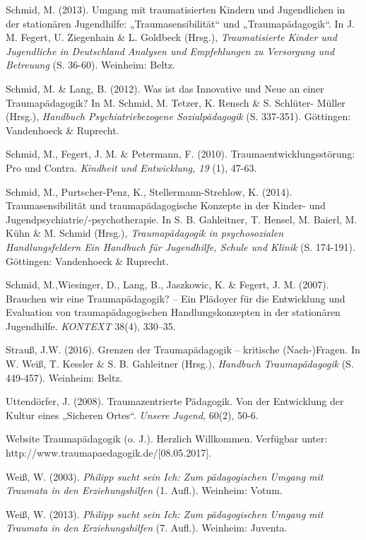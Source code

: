 \hang
Schmid, M. (2013). Umgang mit traumatisierten Kindern und Jugendlichen in der station{\"a}ren Jugendhilfe: „Traumasensibilit{\"a}t“ und „Traumap{\"a}dagogik“. In J. M. Fegert, U. Ziegenhain \& L. Goldbeck (Hrsg.), \textit{Traumatisierte Kinder und Jugendliche in Deutschland Analysen und Empfehlungen zu Versorgung und Betreuung} (S. 36-60). Weinheim: Beltz.

\hang
Schmid, M. \& Lang, B. (2012). Was ist das Innovative und Neue an einer Traumap{\"a}dagogik? In M. Schmid, M. Tetzer, K. Rensch \& S. Schlüter- Müller (Hrsg.), \textit{Handbuch Psychiatriebezogene Sozialpädagogik} (S. 337-351). Göttingen: Vandenhoeck \& Ruprecht.

\hang
Schmid, M., Fegert, J. M. \& Petermann, F. (2010). Traumaentwicklungsstörung: Pro und Contra. \textit{Kindheit und Entwicklung, 19} (1), 47-63.

\hang
Schmid, M., Purtscher-Penz, K., Stellermann-Strehlow, K. (2014). Traumasensibilit{\"a}t und traumap{\"a}dagogische Konzepte in der Kinder- und Jugendpsychiatrie/-psychotherapie. In S. B. Gahleitner, T. Hensel, M. Baierl, M. K{\"u}hn \& M. Schmid (Hrsg.), \textit{Traumap{\"a}dagogik in psychosozialen Handlungsfeldern Ein Handbuch f{\"u}r Jugendhilfe, Schule und Klinik} (S. 174-191). Göttingen: Vandenhoeck \& Ruprecht.

\hang
Schmid, M.,Wiesinger, D., Lang, B., Jaszkowic, K. \& Fegert, J. M. (2007). Brauchen wir eine Traumap{\"a}dagogik? – Ein Pl{\"a}doyer f{\"u}r die Entwicklung und Evaluation von traumap{\"a}dagogischen Handlungskonzepten in der station{\"a}ren Jugendhilfe. \textit{KONTEXT} 38(4), 330–35.

\hang
Strauß, J.W. (2016). Grenzen der Traumap{\"a}dagogik – kritische (Nach-)Fragen. In W. Weiß, T. Kessler \& S. B. Gahleitner (Hrsg.), \textit{Handbuch Traumapädagogik} (S. 449-457). Weinheim: Beltz.

\hang
Uttendörfer, J. (2008). Traumazentrierte Pädagogik. Von der Entwicklung der Kultur eines „Sicheren Ortes“. \textit{Unsere Jugend}, 60(2), 50-6.

\hang
Website Traumapädagogik (o. J.). Herzlich Willkommen. Verfügbar unter:\\ http://www.traumapaedagogik.de/[08.05.2017].

\hang
Weiß, W. (2003). \textit{Philipp sucht sein Ich: Zum pädagogischen Umgang mit Traumata in den Erziehungshilfen} (1. Aufl.). Weinheim: Votum.

\hang
Weiß, W. (2013). \textit{Philipp sucht sein Ich: Zum pädagogischen Umgang mit Traumata in den Erziehungshilfen} (7. Aufl.). Weinheim: Juventa.

